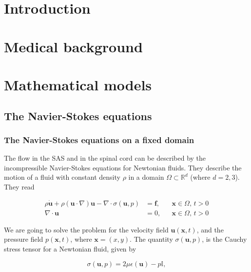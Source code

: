 \documentclass[11pt,a4paper,titlepage]{report}
\begin{document}

\tableofcontents
{}

\newpage


\chapter{Introduction}

\chapter{Medical background}

\chapter{Mathematical models}

\section{The Navier-Stokes equations}

\subsection{The Navier-Stokes equations on a fixed domain}


The flow in the SAS and in the spinal cord can be described by the incompressible Navier-Stokes equations for Newtonian fluids. They describe the motion of a fluid with constant density $\rho$ in a domain $\Omega \subset \mathbb{R}^d$ (where $d=2,3$). They read

\begin{align}
\rho \dot{\mathbf{u}} + \rho (\mathbf{u} \cdot \nabla)\mathbf{u} - \nabla \cdot \sigma(\mathbf{u},p) &= \mathbf{f},  && \mathbf{x} \in \Omega, \, t>0 \\
\nabla \cdot \mathbf{u} &= 0, && \mathbf{x} \in \Omega, \, t>0
\end{align}

We are going to solve the problem for the velocity field $\mathbf{u}(\mathbf{x},t)$, and the pressure field $p(\mathbf{x},t)$, where $\mathbf{x} = (x,y)$. The quantity $\sigma(\mathbf{u}, p)$, is the Cauchy stress tensor for a Newtonian fluid, given by

\[
\sigma(\mathbf{u}, p) = 2 \mu \epsilon(\mathbf{u}) - p \mathbb{I},
\]
\end{document}
